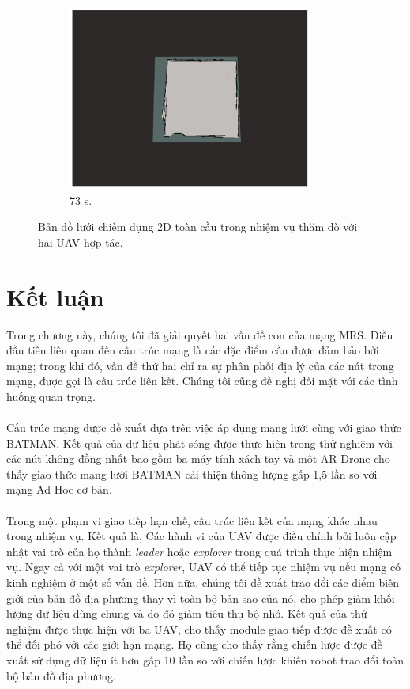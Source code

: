 \documentclass[11pt,openany]{book}
\begin{document}
\begin{figure}[H]
\begin{subfigure}[H]{0.3\linewidth}
        \includegraphics[width=\linewidth]{assets/4_12_i.png}
        \caption{{73 s.}}
        \label{fig:4.12i}
    \end{subfigure}
    \caption{{Bản đồ lưới chiếm dụng 2D toàn cầu trong nhiệm vụ thăm dò với hai UAV hợp tác.}}
    \label{fig:4.12}
\end{figure}
\section{Kết luận}
Trong chương này, chúng tôi đã giải quyết hai vấn đề con của mạng MRS. Điều đầu tiên liên quan đến cấu trúc mạng là các đặc điểm cần được đảm bảo bởi mạng; trong khi đó, vấn đề thứ hai chỉ ra sự phân phối địa lý của các nút trong mạng, được gọi là cấu trúc liên kết. Chúng tôi cũng đề nghị đối mặt với các tình huống quan trọng.\\\\
Cấu trúc mạng được đề xuất dựa trên việc áp dụng mạng lưới cùng với giao thức BATMAN. Kết quả của dữ liệu phát sóng được thực hiện trong thử nghiệm với các nút không đồng nhất bao gồm ba máy tính xách tay và một AR-Drone cho thấy giao thức mạng lưới BATMAN cải thiện thông lượng gấp 1,5 lần so với mạng Ad Hoc cơ bản.\\\\
Trong một phạm vi giao tiếp hạn chế, cấu trúc liên kết của mạng khác nhau trong nhiệm vụ. Kết quả là, Các hành vi của UAV được điều chỉnh bởi luôn cập nhật vai trò của họ thành \textit{leader} hoặc \textit{explorer} trong quá trình thực hiện nhiệm vụ. Ngay cả với một vai trò \textit{explorer}, UAV có thể tiếp tục nhiệm vụ nếu mạng có kinh nghiệm ở một số vấn đề. Hơn nữa, chúng tôi đề xuất trao đổi các điểm biên giới của bản đồ địa phương thay vì toàn bộ bản sao của nó, cho phép giảm khối lượng dữ liệu dùng chung và do đó giảm tiêu thụ bộ nhớ. Kết quả của thử nghiệm được thực hiện với ba UAV, cho thấy module giao tiếp được đề xuất có thể đối phó với các giới hạn mạng. Họ cũng cho thấy rằng chiến lược được đề xuất sử dụng dữ liệu ít hơn gấp 10 lần so với chiến lược khiến robot trao đổi toàn bộ bản đồ địa phương.

\printbibliography[heading=bibintoc,title=Tài liệu tham khảo]
\end{document}
